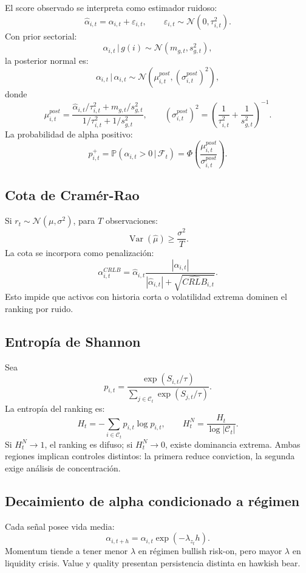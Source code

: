 \documentclass[11pt,letterpaper]{article}
\DeclareMathOperator{\Var}{Var}
\newcommand{\Prob}{\mathbb{P}}
\newcommand{\F}{\mathcal{F}}
\newcommand{\N}{\mathcal{N}}
\newcommand{\1}{\mathbf{1}}
\newcommand{\eps}{\varepsilon}
\newcommand{\given}{\,|\,}
\begin{document}
El score observado se interpreta como estimador ruidoso:
\[
    \hat\alpha_{i,t}
    =
    \alpha_{i,t}+\eps_{i,t},
    \qquad
    \eps_{i,t}\sim\N(0,\tau_{i,t}^2).
\]
Con prior sectorial:
\[
    \alpha_{i,t}\given g(i)
    \sim
    \N(m_{g,t},s_{g,t}^2),
\]
la posterior normal es:
\[
    \alpha_{i,t}\given\hat\alpha_{i,t}
    \sim
    \N(\mu^{post}_{i,t},(\sigma^{post}_{i,t})^2),
\]
donde
\[
    \mu^{post}_{i,t}
    =
    \frac{
        \hat\alpha_{i,t}/\tau_{i,t}^2 + m_{g,t}/s_{g,t}^2
    }{
        1/\tau_{i,t}^2 + 1/s_{g,t}^2
    },
    \qquad
    (\sigma^{post}_{i,t})^2
    =
    \left(
        \frac{1}{\tau_{i,t}^2}
        +
        \frac{1}{s_{g,t}^2}
    \right)^{-1}.
\]
La probabilidad de alpha positivo:
\[
    p^+_{i,t}
    =
    \Prob(\alpha_{i,t}>0\given\F_t)
    =
    \Phi\left(
        \frac{\mu^{post}_{i,t}}{\sigma^{post}_{i,t}}
    \right).
\]

\subsection{Cota de Cramér-Rao}

Si \(r_t\sim\N(\mu,\sigma^2)\), para \(T\) observaciones:
\[
    \Var(\hat\mu)\ge \frac{\sigma^2}{T}.
\]
La cota se incorpora como penalización:
\[
    \alpha^{CRLB}_{i,t}
    =
    \hat\alpha_{i,t}
    \frac{|\hat\alpha_{i,t}|}
    {|\hat\alpha_{i,t}|+\sqrt{\widehat{CRLB}_{i,t}}}.
\]
Esto impide que activos con historia corta o volatilidad extrema dominen el ranking por ruido.

\subsection{Entropía de Shannon}

Sea
\[
    p_{i,t}
    =
    \frac{\exp(S_{i,t}/\tau)}
    {\sum_{j\in\mathcal{C}_t}\exp(S_{j,t}/\tau)}.
\]
La entropía del ranking es:
\[
    H_t
    =
    -\sum_{i\in\mathcal{C}_t}p_{i,t}\log p_{i,t},
    \qquad
    H^N_t=\frac{H_t}{\log |\mathcal{C}_t|}.
\]
Si \(H^N_t\to 1\), el ranking es difuso; si \(H^N_t\to 0\), existe dominancia extrema. Ambas regiones implican controles distintos: la primera reduce conviction, la segunda exige análisis de concentración.

\subsection{Decaimiento de alpha condicionado a régimen}

Cada señal posee vida media:
\[
    \alpha_{i,t+h}
    =
    \alpha_{i,t}\exp(-\lambda_{z_t}h).
\]
Momentum tiende a tener menor \(\lambda\) en régimen bullish risk-on, pero mayor \(\lambda\) en liquidity crisis. Value y quality presentan persistencia distinta en hawkish bear.
\end{document}
